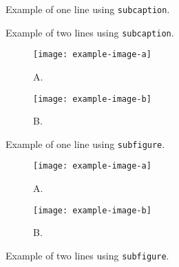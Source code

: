 \documentclass[12pt,a4paper]{article}
\begin{document}
\begin{figure}[htbp]
    \centering
    \caption{Example of one line using \texttt{subcaption}.}
\end{figure}

\begin{figure}[htbp]
    \centering

    \caption{Example of two lines using \texttt{subcaption}.}
\end{figure}

\begin{figure}[htbp]
    \centering
    \begin{subfigure}{0.33\linewidth}
        \centering
        \texttt{[image: example-image-a]}
        \caption{A.}
    \end{subfigure}
    \begin{subfigure}{0.33\linewidth}
        \centering
        \texttt{[image: example-image-b]}
        \caption{B.}
    \end{subfigure}
    \caption{Example of one line using \texttt{subfigure}.}
\end{figure}

\begin{figure}[htbp]
    \centering
    \begin{subfigure}{0.33\linewidth}
        \centering
        \texttt{[image: example-image-a]}
        \caption{A.}
    \end{subfigure}

    \begin{subfigure}{0.33\linewidth}
        \centering
        \texttt{[image: example-image-b]}
        \caption{B.}
    \end{subfigure}
    \caption{Example of two lines using \texttt{subfigure}.}
\end{figure}
\end{document}
